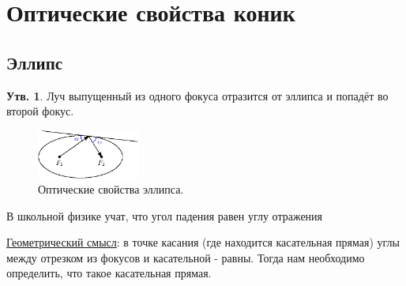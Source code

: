 \documentclass[12pt]{article}
\theoremstyle{definition}
\newtheorem{prop}{Утв.}
\begin{document}

\section*{Оптические свойства коник}

\subsection*{Эллипс}

\begin{prop}
	Луч выпущенный из одного фокуса отразится от эллипса и попадёт во второй фокус.
\end{prop}

\begin{figure}[H]
	\centering
	\includegraphics[width=0.3\textwidth]{ANGL2_1.eps}
	\caption{Оптические свойства эллипса.}
	\label{2_1}
\end{figure}
В школьной физике учат, что угол падения равен углу отражения

\uline{Геометрический смысл}: в точке касания (где находится касательная прямая) углы между отрезком из фокусов и касательной - равны. Тогда нам необходимо определить, что такое касательная прямая.
\end{document}
